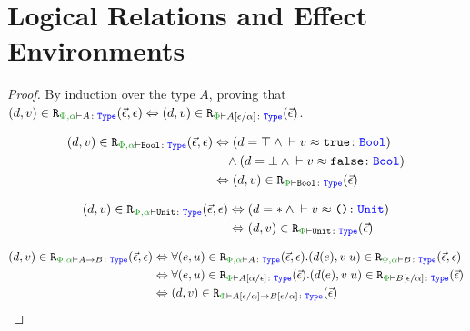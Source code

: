 


\section{Logical Relations and Effect Environments}
\label{AdequacyEnvironmentsProof}

\begin{framed}
    \begin{proof}
        By induction over the type $A$, proving that $\inLogRel{d}{v}{\P,\a}{A}{\ev, \e} \Leftrightarrow \inLogRelPE{d}{v}{A\ssub{\a}{\e}}$.
    
                \begin{align*}
                    \inLogRel{d}{v}{\P,\a}{\B}{\ev, \e} & \Leftrightarrow (d = \top \wedge \zberelation{v}{\t}{\B})
                    \\ 
                    & \quad\wedge(d = \bot \wedge \zberelation{v}{\f}{\B})
                    \\
                    & \Leftrightarrow  \inLogRelPE{d}{v}{\B}
                \end{align*}
        
            \begin{align*}
                \inLogRel{d}{v}{\P,\a}{\U}{\ev, \e} & \Leftrightarrow (d = \singleton \wedge \zberelation{v}{\u}{\U})
                \\
                & \Leftrightarrow  \inLogRelPE{d}{v}{\U}
            \end{align*}
        
            \case{\tfun}
            \begin{align*}
                \inLogRel{d}{v}{\P,\a}{\ab}{\ev, \e} & \Leftrightarrow \forall\inLogRel{e}{u}{\P,\a}{A}{\ev, \e}. \inLogRel{d(e)}{\apply{v}{u}}{\P,\a}{B}{\ev, \e} 
                \\
                & \Leftrightarrow 
                \forall\inLogRelPE{e}{u}{A\ssub{\e}{\a}}. \inLogRelPE{d(e)}{\apply{v}{u}}{B\ssub{\a}{\e}}
                \\
                & \Leftrightarrow  \inLogRelPE{d}{v}{\fntype{A\ssub{\a}{\e}}{B\ssub{\a}{\e}}}
                \\
            \end{align*}
        
            \case{\teffect}
        

\end{proof}
\end{framed}
